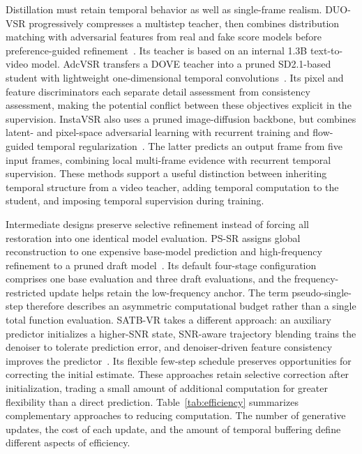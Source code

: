 Distillation must retain temporal behavior as well as single-frame realism. DUO-VSR progressively compresses a multistep teacher, then combines distribution matching with adversarial features from real and fake score models before preference-guided refinement~\cite{duovsr}. Its teacher is based on an internal 1.3B text-to-video model. AdcVSR transfers a DOVE teacher into a pruned SD2.1-based student with lightweight one-dimensional temporal convolutions~\cite{adcvsr}. Its pixel and feature discriminators each separate detail assessment from consistency assessment, making the potential conflict between these objectives explicit in the supervision. InstaVSR also uses a pruned image-diffusion backbone, but combines latent- and pixel-space adversarial learning with recurrent training and flow-guided temporal regularization~\cite{instavsr}. The latter predicts an output frame from five input frames, combining local multi-frame evidence with recurrent temporal supervision. These methods support a useful distinction between inheriting temporal structure from a video teacher, adding temporal computation to the student, and imposing temporal supervision during training.

Intermediate designs preserve selective refinement instead of forcing all restoration into one identical model evaluation. PS-SR assigns global reconstruction to one expensive base-model prediction and high-frequency refinement to a pruned draft model~\cite{pssr}. Its default four-stage configuration comprises one base evaluation and three draft evaluations, and the frequency-restricted update helps retain the low-frequency anchor. The term pseudo-single-step therefore describes an asymmetric computational budget rather than a single total function evaluation. SATB-VR takes a different approach: an auxiliary predictor initializes a higher-SNR state, SNR-aware trajectory blending trains the denoiser to tolerate prediction error, and denoiser-driven feature consistency improves the predictor~\cite{satbvr}. Its flexible few-step schedule preserves opportunities for correcting the initial estimate. These approaches retain selective correction after initialization, trading a small amount of additional computation for greater flexibility than a direct prediction. Table~\ref{tab:efficiency} summarizes complementary approaches to reducing computation. The number of generative updates, the cost of each update, and the amount of temporal buffering define different aspects of efficiency.

